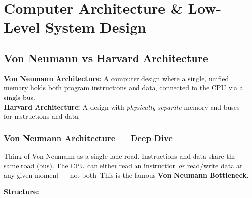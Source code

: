 \documentclass[11pt,a4paper]{article}
\newcommand{\term}[1]{\textbf{\color{darkblue}#1}}
\begin{document}
\tableofcontents
\clearpage

\section{Computer Architecture \& Low-Level System Design}

\subsection{Von Neumann vs Harvard Architecture}

\begin{mydef}
\textbf{Von Neumann Architecture:} A computer design where a single, unified memory holds both program instructions and data, connected to the CPU via a single bus.\\[4pt]
\textbf{Harvard Architecture:} A design with \textit{physically separate} memory and buses for instructions and data.
\end{mydef}

\subsubsection{Von Neumann Architecture --- Deep Dive}

Think of Von Neumann as a single-lane road. Instructions and data share the same road (bus). The CPU can either read an instruction \textit{or} read/write data at any given moment --- not both. This is the famous \term{Von Neumann Bottleneck}.

\textbf{Structure:}
\begin{center}
\end{center}
\end{document}
